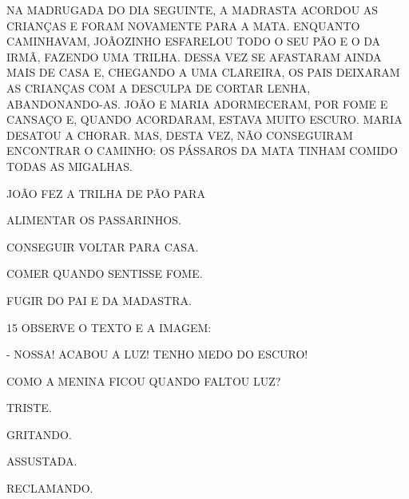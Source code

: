 NA MADRUGADA DO DIA SEGUINTE, A MADRASTA ACORDOU AS CRIANÇAS E FORAM
NOVAMENTE PARA A MATA. ENQUANTO CAMINHAVAM, JOÃOZINHO ESFARELOU TODO O
SEU PÃO E O DA IRMÃ, FAZENDO UMA TRILHA. DESSA VEZ SE AFASTARAM AINDA
MAIS DE CASA E, CHEGANDO A UMA CLAREIRA, OS PAIS DEIXARAM AS CRIANÇAS
COM A DESCULPA DE CORTAR LENHA, ABANDONANDO-AS. JOÃO E MARIA
ADORMECERAM, POR FOME E CANSAÇO E, QUANDO ACORDARAM, ESTAVA MUITO
ESCURO. MARIA DESATOU A CHORAR. MAS, DESTA VEZ, NÃO CONSEGUIRAM
ENCONTRAR O CAMINHO: OS PÁSSAROS DA MATA TINHAM COMIDO TODAS AS
MIGALHAS.


JOÃO FEZ A TRILHA DE PÃO PARA

\begin{escolha}
\item ALIMENTAR OS PASSARINHOS.

\item CONSEGUIR VOLTAR PARA CASA.

\item COMER QUANDO SENTISSE FOME.

\item FUGIR DO PAI E DA MADASTRA.
\end{escolha}


\num{15} OBSERVE O TEXTO E A IMAGEM:


- NOSSA! ACABOU A LUZ! TENHO MEDO DO ESCURO!

COMO A MENINA FICOU QUANDO FALTOU LUZ?

\begin{escolha}
\item TRISTE.

\item GRITANDO.

\item ASSUSTADA.

\item RECLAMANDO.
\end{escolha}

